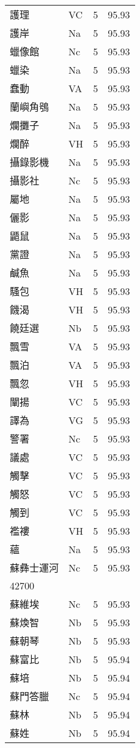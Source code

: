 \documentclass[twocolumn]{book}
\begin{document}
\begin{supertabular}{llrr}
護理 & VC & 5 &  95.93\\
護岸 & Na & 5 &  95.93\\
蠟像館 & Nc & 5 &  95.93\\
蠟染 & Na & 5 &  95.93\\
蠢動 & VA & 5 &  95.93\\
蘭嶼角鴞 & Na & 5 &  95.93\\
爛攤子 & Na & 5 &  95.93\\
爛醉 & VH & 5 &  95.93\\
攝錄影機 & Na & 5 &  95.93\\
攝影社 & Nc & 5 &  95.93\\
屬地 & Na & 5 &  95.93\\
儷影 & Na & 5 &  95.93\\
鼯鼠 & Na & 5 &  95.93\\
黨證 & Na & 5 &  95.93\\
鹹魚 & Na & 5 &  95.93\\
騷包 & VH & 5 &  95.93\\
饑渴 & VH & 5 &  95.93\\
饒廷選 & Nb & 5 &  95.93\\
飄雪 & VA & 5 &  95.93\\
飄泊 & VA & 5 &  95.93\\
飄忽 & VH & 5 &  95.93\\
闡揚 & VC & 5 &  95.93\\
譯為 & VG & 5 &  95.93\\
警署 & Nc & 5 &  95.93\\
議處 & VC & 5 &  95.93\\
觸擊 & VC & 5 &  95.93\\
觸怒 & VC & 5 &  95.93\\
觸到 & VC & 5 &  95.93\\
襤褸 & VH & 5 &  95.93\\
蘊 & Na & 5 &  95.93\\
蘇彝士運河 & Nc & 5 &  95.93\\
42700\\
蘇維埃 & Nc & 5 &  95.93\\
蘇煥智 & Nb & 5 &  95.93\\
蘇朝琴 & Nb & 5 &  95.93\\
蘇富比 & Nb & 5 &  95.94\\
蘇培 & Nb & 5 &  95.94\\
蘇門答臘 & Nc & 5 &  95.94\\
蘇林 & Nb & 5 &  95.94\\
蘇姓 & Nb & 5 &  95.94\\

\end{supertabular}
\end{document}
